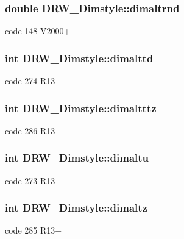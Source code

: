 \subsubsection[{dimaltrnd}]{\setlength{\rightskip}{0pt plus 5cm}double D\+R\+W\+\_\+\+Dimstyle\+::dimaltrnd}\label{class_d_r_w___dimstyle_a023f32391a544dc81aabadd2e163f90d}
code 148 V2000+ \hypertarget{class_d_r_w___dimstyle_a3856be49d2e138cc1c6605ae1bf7b14a}{}
\subsubsection[{dimalttd}]{\setlength{\rightskip}{0pt plus 5cm}int D\+R\+W\+\_\+\+Dimstyle\+::dimalttd}\label{class_d_r_w___dimstyle_a3856be49d2e138cc1c6605ae1bf7b14a}
code 274 R13+ \hypertarget{class_d_r_w___dimstyle_af4c0b630cd4485a16cafe42ddcda6b0a}{}
\subsubsection[{dimaltttz}]{\setlength{\rightskip}{0pt plus 5cm}int D\+R\+W\+\_\+\+Dimstyle\+::dimaltttz}\label{class_d_r_w___dimstyle_af4c0b630cd4485a16cafe42ddcda6b0a}
code 286 R13+ \hypertarget{class_d_r_w___dimstyle_afa6555bf1abbabe03f6a48a9b8e1026c}{}
\subsubsection[{dimaltu}]{\setlength{\rightskip}{0pt plus 5cm}int D\+R\+W\+\_\+\+Dimstyle\+::dimaltu}\label{class_d_r_w___dimstyle_afa6555bf1abbabe03f6a48a9b8e1026c}
code 273 R13+ \hypertarget{class_d_r_w___dimstyle_a841079cef255e9f6d06d7b97a28c67ec}{}
\subsubsection[{dimaltz}]{\setlength{\rightskip}{0pt plus 5cm}int D\+R\+W\+\_\+\+Dimstyle\+::dimaltz}\label{class_d_r_w___dimstyle_a841079cef255e9f6d06d7b97a28c67ec}
code 285 R13+ \hypertarget{class_d_r_w___dimstyle_a933deca82de6d15d82ada90f8731a00b}{}

